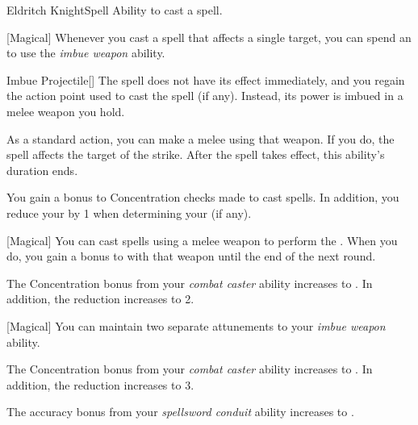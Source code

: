     \begin{feat}{Eldritch Knight}{Spell}
        \featpre Ability to cast a spell.

        [Magical] Whenever you cast a spell that affects a single target, you can spend an  to use the \textit{imbue weapon} ability.
        \begin{ability}{Imbue Projectile}[]
            The spell does not have its effect immediately, and you regain the action point used to cast the spell (if any).
            Instead, its power is imbued in a melee weapon you hold. 

            As a standard action, you can make a melee  using that weapon.
            If you do, the spell affects the target of the strike.
            After the spell takes effect, this ability's duration ends.
        \end{ability}

         You gain a  bonus to Concentration checks made to cast spells.
        In addition, you reduce your  by 1 when determining your  (if any).

        [Magical] You can cast spells using a melee weapon to perform the .
        When you do, you gain a  bonus to  with that weapon until the end of the next round.

         The Concentration bonus from your \textit{combat caster} ability increases to .
        In addition, the  reduction increases to 2.

        [Magical] You can maintain two separate attunements to your \textit{imbue weapon} ability.

         The Concentration bonus from your \textit{combat caster} ability increases to .
        In addition, the  reduction increases to 3.

         The accuracy bonus from your \textit{spellsword conduit} ability increases to .
    \end{feat}

